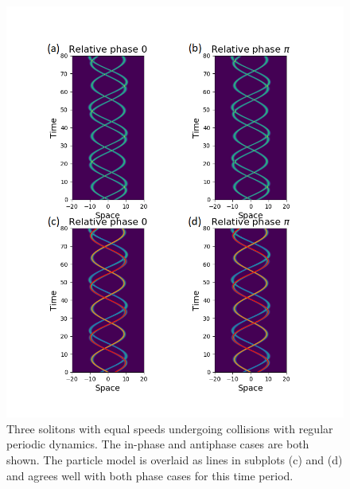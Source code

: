 \documentclass[10pt, twocolumn]{revtex4}    %
\begin{document}
\begin{figure}[h]
\includegraphics[width=\columnwidth]{3solitons.png}
\caption{Three solitons with equal speeds undergoing collisions with regular periodic dynamics. The in-phase and antiphase cases are both shown. The particle model is overlaid as lines in subplots (c) and (d) and agrees well with both phase cases for this time period.}
\label{3solitons}
\end{figure}
\end{document}

